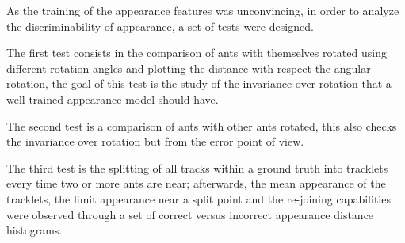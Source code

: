 {
    As the training of the appearance features was unconvincing, in order to analyze the discriminability of appearance, a set of tests were designed.
}

{
    The first test consists in the comparison of ants with themselves rotated using different rotation angles and plotting the distance with respect the angular rotation, the goal of this test is the study of the invariance over rotation that a well trained appearance model should have.
}

{
    The second test is a comparison of ants with other ants rotated, this also checks the invariance over rotation but from the error point of view.
}

{
    The third test is the splitting of all tracks within a ground truth into tracklets every time two or more ants are near; afterwards, the mean appearance of the tracklets, the limit appearance near a split point and the re-joining capabilities were observed through a set of correct versus incorrect appearance distance histograms.
}
